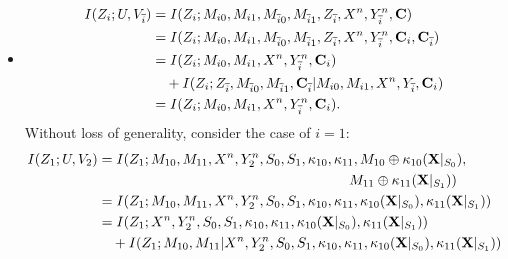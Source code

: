 \documentclass[runningheads]{llncs}
\newcommand{\parbreak}{ \vspace{0.3 em}}
\begin{document}
\begin{itemize}
    \parbreak Then, Eq. \eqref{final2: BC-nColl} tends to: 
    \begin{align*}
        \lim_{n\rightarrow\infty} I (  M_{1\overline{Z}_1};Z_1,Y_1^n, Y_2^n, \mathbf{C}_1)& \leq \lim_{n\rightarrow\infty} \frac{2^{-n\lambda'}}{\ln 2} = 0.
    \end{align*}
    The second term of \eqref{eq: mid} can be proved in the same fashion knowing that, $\mathbf{C}_2 = (S'\triangleq (S'_0,S'_1), \kappa_{20}, \kappa_{21}, M_{20}\oplus\kappa_{20} ((\mathbf{X}|_{S'})|_{S'_0}), M_{21}\oplus\kappa_{21}((\mathbf{X}|_{S'})|_{S'_1}))$. Then, \eqref{eq: mid} tends to zero as $n\to\infty$. 
    \item \begin{align}\label{eq: ind}
    I (Z_i; U, V_{\overline{i}}) & = I(Z_i;M_{i0},M_{i1},M_{\overline{i}0},M_{\overline{i}1}, Z_{\overline{i}}, X^n, Y_{\overline{i}}^n, \mathbf{C})\notag\\
    & = I(Z_i;M_{i0},M_{i1},M_{\overline{i}0},M_{\overline{i}1}, Z_{\overline{i}}, X^n, Y_{\overline{i}}^n, \mathbf{C}_i,\mathbf{C}_{\overline{i}})\notag\\
    & = I(Z_i;M_{i0},M_{i1},X^n, Y_{\overline{i}}^n, \mathbf{C}_i)\notag\\
    & \quad + I(Z_i;Z_{\overline{i}},M_{\overline{i}0},M_{\overline{i}1},\mathbf{C}_{\overline{i}}|M_{i0},M_{i1},X^n,Y_{\overline{i}},\mathbf{C}_i)\notag\\
    & = I(Z_i;M_{i0},M_{i1},X^n, Y_{\overline{i}}^n, \mathbf{C}_i).
    \end{align}
    Without loss of generality, consider the case of $i=1$:
\begin{align}\label{eq: perfect}
        I(Z_1;U,V_2)& = I(Z_1;M_{10},M_{11},X^n, Y_{2}^n, S_0,S_1, \kappa_{10}, \kappa_{11},M_{10}\oplus\kappa_{10} (\mathbf{X}|_{S_0}),\notag\\
        & \qquad\qquad\qquad\qquad\qquad\qquad\qquad\qquad\qquad M_{11}\oplus\kappa_{11}(\mathbf{X}|_{S_1}))\notag\\
        & = I(Z_1;M_{10},M_{11},X^n, Y_{2}^n, S_0,S_1, \kappa_{10}, \kappa_{11}, \kappa_{10} (\mathbf{X}|_{S_0}), \kappa_{11}(\mathbf{X}|_{S_1}))\notag\\
        & = I(Z_1;X^n, Y_2^n, S_0,S_1, \kappa_{10}, \kappa_{11}, \kappa_{10} (\mathbf{X}|_{S_0}), \kappa_{11}(\mathbf{X}|_{S_1}))\notag\\
        & \quad + I(Z_1;M_{10},M_{11}|X^n, Y_2^n, S_0,S_1, \kappa_{10}, \kappa_{11}, \kappa_{10} (\mathbf{X}|_{S_0}), \kappa_{11}(\mathbf{X}|_{S_1})) \notag\\

\end{align}
\end{itemize}
\end{document}
